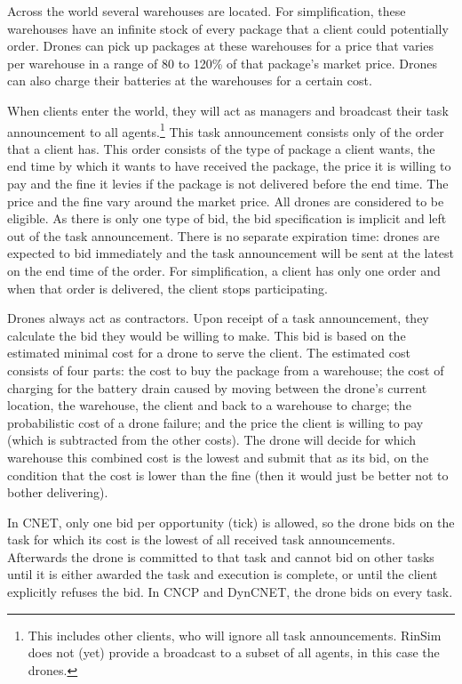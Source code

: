 \documentclass[10pt,a4paper]{article}
\begin{document}
Across the world several warehouses are located. For simplification, these warehouses have an infinite stock of every package that a client could potentially order. Drones can pick up packages at these warehouses for a price that varies per warehouse in a range of 80 to 120\% of that package's market price. Drones can also charge their batteries at the warehouses for a certain cost.

When clients enter the world, they will act as managers and broadcast their task announcement to all agents.\footnote{This includes other clients, who will ignore all task announcements. RinSim does not (yet) provide a broadcast to a subset of all agents, in this case the drones.} This task announcement consists only of the order that a client has. This order consists of the type of package a client wants, the end time by which it wants to have received the package, the price it is willing to pay and the fine it levies if the package is not delivered before the end time. The price and the fine vary around the market price. All drones are considered to be eligible. As there is only one type of bid, the bid specification is implicit and left out of the task announcement. There is no separate expiration time: drones are expected to bid immediately and the task announcement will be sent at the latest on the end time of the order. For simplification, a client has only one order and when that order is delivered, the client stops participating.

Drones always act as contractors. Upon receipt of a task announcement, they calculate the bid they would be willing to make. This bid is based on the estimated minimal cost for a drone to serve the client. The estimated cost consists of four parts: the cost to buy the package from a warehouse; the cost of charging for the battery drain caused by moving between the drone's current location, the warehouse, the client and back to a warehouse to charge; the probabilistic cost of a drone failure; and the price the client is willing to pay (which is subtracted from the other costs). The drone will decide for which warehouse this combined cost is the lowest and submit that as its bid, on the condition that the cost is lower than the fine (then it would just be better not to bother delivering).

In CNET, only one bid per opportunity (tick) is allowed, so the drone bids on the task for which its cost is the lowest of all received task announcements. Afterwards the drone is committed to that task and cannot bid on other tasks until it is either awarded the task and execution is complete, or until the client explicitly refuses the bid. In CNCP and DynCNET, the drone bids on every task.
\end{document}
